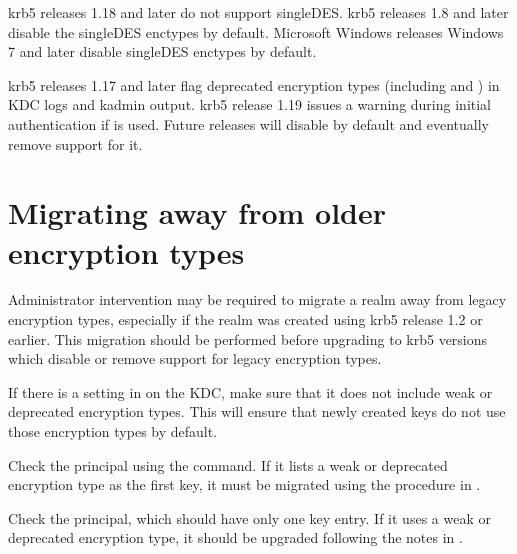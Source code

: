 \documentclass[letterpaper,10pt,english]{sphinxmanual}
\begin{document}
\sphinxAtStartPar
krb5 releases 1.18 and later do not support single\sphinxhyphen{}DES.  krb5 releases
1.8 and later disable the single\sphinxhyphen{}DES enctypes by default.  Microsoft
Windows releases Windows 7 and later disable single\sphinxhyphen{}DES enctypes by
default.

\sphinxAtStartPar
krb5 releases 1.17 and later flag deprecated encryption types
(including  and ) in KDC logs and
kadmin output.  krb5 release 1.19 issues a warning during initial
authentication if  is used.  Future releases will
disable  by default and eventually remove support for
it.


\section{Migrating away from older encryption types}
\label{\detokenize{admin/enctypes:migrating-away-from-older-encryption-types}}
\sphinxAtStartPar
Administrator intervention may be required to migrate a realm away
from legacy encryption types, especially if the realm was created
using krb5 release 1.2 or earlier.  This migration should be performed
before upgrading to krb5 versions which disable or remove support for
legacy encryption types.

\sphinxAtStartPar
If there is a  setting in {\hyperref[\detokenize{admin/conf_files/kdc_conf:kdc-conf-5}]{}} on
the KDC, make sure that it does not include weak or deprecated
encryption types.  This will ensure that newly created keys do not use
those encryption types by default.

\sphinxAtStartPar
Check the  principal using the {\hyperref[\detokenize{admin/admin_commands/kadmin_local:kadmin-1}]{}}
 command.  If it lists a weak or deprecated encryption
type as the first key, it must be migrated using the procedure in
{\hyperref[\detokenize{admin/database:changing-krbtgt-key}]{}}.

\sphinxAtStartPar
Check the  principal, which should have only one key
entry.  If it uses a weak or deprecated encryption type, it should be
upgraded following the notes in {\hyperref[\detokenize{admin/database:updating-history-key}]{}}.
\end{document}

